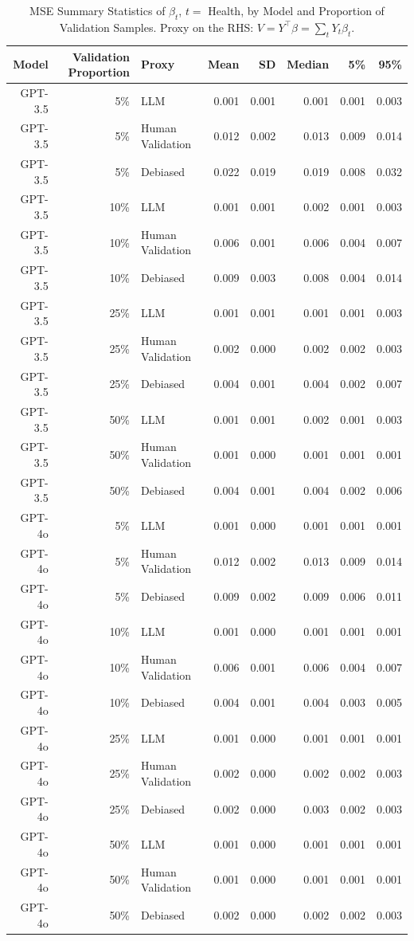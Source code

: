\begin{table}

\caption{MSE Summary Statistics of $\beta_{t}$, $t=$ Health, by Model and Proportion of Validation Samples.
      Proxy on the RHS: $V = Y^\top \beta = \sum_{t} Y_t \beta_t$.}
\centering
\begin{tabular}[t]{rrlrrrrr}
\toprule
Model & Validation Proportion & Proxy & Mean & SD & Median & 5\% & 95\%\\
\midrule
GPT-3.5 & 5\% & LLM & 0.001 & 0.001 & 0.001 & 0.001 & 0.003\\
GPT-3.5 & 5\% & Human Validation & 0.012 & 0.002 & 0.013 & 0.009 & 0.014\\
GPT-3.5 & 5\% & Debiased & 0.022 & 0.019 & 0.019 & 0.008 & 0.032\\
GPT-3.5 & 10\% & LLM & 0.001 & 0.001 & 0.002 & 0.001 & 0.003\\
GPT-3.5 & 10\% & Human Validation & 0.006 & 0.001 & 0.006 & 0.004 & 0.007\\
GPT-3.5 & 10\% & Debiased & 0.009 & 0.003 & 0.008 & 0.004 & 0.014\\
GPT-3.5 & 25\% & LLM & 0.001 & 0.001 & 0.001 & 0.001 & 0.003\\
GPT-3.5 & 25\% & Human Validation & 0.002 & 0.000 & 0.002 & 0.002 & 0.003\\
GPT-3.5 & 25\% & Debiased & 0.004 & 0.001 & 0.004 & 0.002 & 0.007\\
GPT-3.5 & 50\% & LLM & 0.001 & 0.001 & 0.002 & 0.001 & 0.003\\
GPT-3.5 & 50\% & Human Validation & 0.001 & 0.000 & 0.001 & 0.001 & 0.001\\
GPT-3.5 & 50\% & Debiased & 0.004 & 0.001 & 0.004 & 0.002 & 0.006\\
GPT-4o & 5\% & LLM & 0.001 & 0.000 & 0.001 & 0.001 & 0.001\\
GPT-4o & 5\% & Human Validation & 0.012 & 0.002 & 0.013 & 0.009 & 0.014\\
GPT-4o & 5\% & Debiased & 0.009 & 0.002 & 0.009 & 0.006 & 0.011\\
GPT-4o & 10\% & LLM & 0.001 & 0.000 & 0.001 & 0.001 & 0.001\\
GPT-4o & 10\% & Human Validation & 0.006 & 0.001 & 0.006 & 0.004 & 0.007\\
GPT-4o & 10\% & Debiased & 0.004 & 0.001 & 0.004 & 0.003 & 0.005\\
GPT-4o & 25\% & LLM & 0.001 & 0.000 & 0.001 & 0.001 & 0.001\\
GPT-4o & 25\% & Human Validation & 0.002 & 0.000 & 0.002 & 0.002 & 0.003\\
GPT-4o & 25\% & Debiased & 0.002 & 0.000 & 0.003 & 0.002 & 0.003\\
GPT-4o & 50\% & LLM & 0.001 & 0.000 & 0.001 & 0.001 & 0.001\\
GPT-4o & 50\% & Human Validation & 0.001 & 0.000 & 0.001 & 0.001 & 0.001\\
GPT-4o & 50\% & Debiased & 0.002 & 0.000 & 0.002 & 0.002 & 0.003\\
\bottomrule
\end{tabular}
\end{table}
